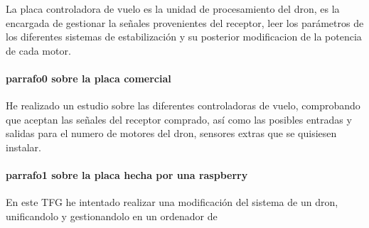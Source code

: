 
La placa controladora de vuelo es la unidad de procesamiento del dron, es la encargada de gestionar la señales provenientes del receptor, leer los parámetros de los diferentes sistemas de estabilización y su posterior modificacion de la potencia de cada motor.
\paragraph{parrafo0 sobre la placa comercial}
He realizado un estudio sobre las diferentes controladoras de vuelo, comprobando que aceptan las señales del receptor comprado, así como las posibles entradas y salidas para el numero de motores del dron, sensores extras que se quisiesen instalar.

\paragraph{parrafo1 sobre la placa hecha por una raspberry}
En este TFG he intentado realizar una modificación del sistema de un dron, unificandolo y gestionandolo en un ordenador de 